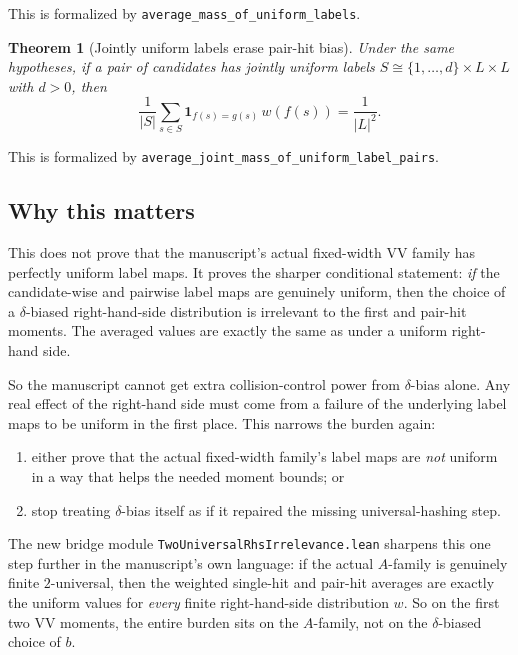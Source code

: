 \documentclass[11pt]{article}
\newtheorem{theorem}{Theorem}[section]
\theoremstyle{remark}
\begin{document}
\noindent
This is formalized by \texttt{average\_mass\_of\_uniform\_labels}.

\begin{theorem}[Jointly uniform labels erase pair-hit bias]
Under the same hypotheses, if a pair of candidates has jointly uniform labels
\(S \cong \{1,\dots,d\} \times L \times L\) with \(d>0\), then
\[
  \frac{1}{|S|}
  \sum_{s \in S} \mathbf{1}_{f(s)=g(s)}\, w(f(s))
  = \frac{1}{|L|^2}.
\]
\end{theorem}

\noindent
This is formalized by \texttt{average\_joint\_mass\_of\_uniform\_label\_pairs}.

\subsection{Why this matters}

This does not prove that the manuscript's actual fixed-width VV family has perfectly uniform label
maps.  It proves the sharper conditional statement: \emph{if} the candidate-wise and pairwise label
maps are genuinely uniform, then the choice of a \(\delta\)-biased right-hand-side distribution is
irrelevant to the first and pair-hit moments.  The averaged values are exactly the same as under a
uniform right-hand side.

So the manuscript cannot get extra collision-control power from \(\delta\)-bias alone.  Any real
effect of the right-hand side must come from a failure of the underlying label maps to be uniform in
the first place.  This narrows the burden again:
\begin{enumerate}[leftmargin=1.5em]
  \item either prove that the actual fixed-width family's label maps are \emph{not} uniform in a
  way that helps the needed moment bounds; or
  \item stop treating \(\delta\)-bias itself as if it repaired the missing universal-hashing step.
\end{enumerate}

The new bridge module \texttt{TwoUniversalRhsIrrelevance.lean} sharpens this one step further in
the manuscript's own language: if the actual \(A\)-family is genuinely finite \(2\)-universal, then
the weighted single-hit and pair-hit averages are exactly the uniform values for \emph{every}
finite right-hand-side distribution \(w\).  So on the first two VV moments, the entire burden sits
on the \(A\)-family, not on the \(\delta\)-biased choice of \(b\).
\end{document}
